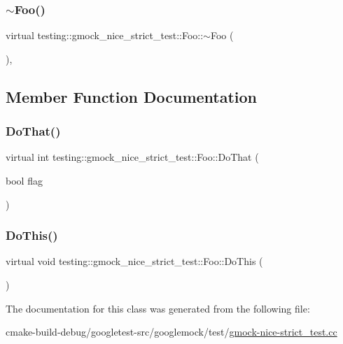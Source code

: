 \subsubsection{\texorpdfstring{$\sim$Foo()}{~Foo()}}
{\footnotesize\ttfamily virtual testing\+::gmock\+\_\+nice\+\_\+strict\+\_\+test\+::\+Foo\+::$\sim$\+Foo (\begin{DoxyParamCaption}{ }\end{DoxyParamCaption})\hspace{0.3cm}{\ttfamily [inline]}, {\ttfamily [virtual]}}



\subsection{Member Function Documentation}
\mbox{\label{classtesting_1_1gmock__nice__strict__test_1_1Foo_a8527a459b03f333a809a3376311a9f8b}} 
\subsubsection{\texorpdfstring{DoThat()}{DoThat()}}
{\footnotesize\ttfamily virtual int testing\+::gmock\+\_\+nice\+\_\+strict\+\_\+test\+::\+Foo\+::\+Do\+That (\begin{DoxyParamCaption}\item[{bool}]{flag }\end{DoxyParamCaption})\hspace{0.3cm}{\ttfamily [pure virtual]}}

\mbox{\label{classtesting_1_1gmock__nice__strict__test_1_1Foo_a79a3cdbd8d9d9f6bc87580563b0d7cec}} 
\subsubsection{\texorpdfstring{DoThis()}{DoThis()}}
{\footnotesize\ttfamily virtual void testing\+::gmock\+\_\+nice\+\_\+strict\+\_\+test\+::\+Foo\+::\+Do\+This (\begin{DoxyParamCaption}{ }\end{DoxyParamCaption})\hspace{0.3cm}{\ttfamily [pure virtual]}}



The documentation for this class was generated from the following file\+:\begin{DoxyCompactItemize}
\item 
cmake-\/build-\/debug/googletest-\/src/googlemock/test/\mbox{\hyperlink{gmock-nice-strict__test_8cc}{gmock-\/nice-\/strict\+\_\+test.\+cc}}\end{DoxyCompactItemize}
